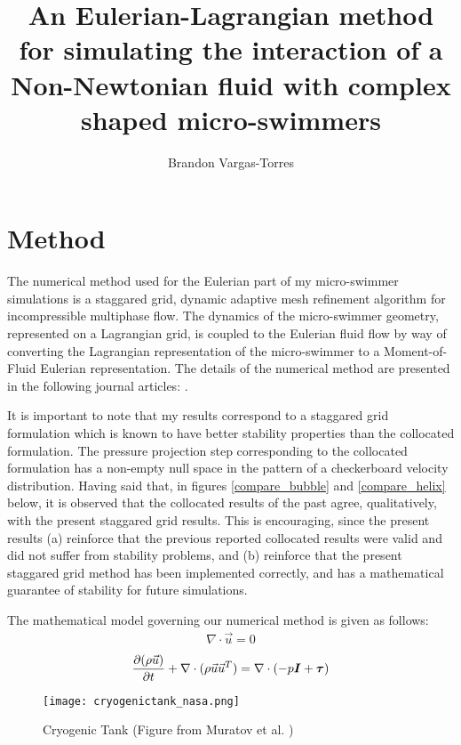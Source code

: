 \documentclass[]{article}
\title{An Eulerian-Lagrangian method for simulating the interaction of a 
 Non-Newtonian fluid with complex shaped micro-swimmers}
\author{Brandon Vargas-Torres}
\newcommand{\bmI}{\mbox{\boldmath $I$\unboldmath}}
\newcommand{\bmtau}{\mbox{\boldmath $\tau$\unboldmath}}
\begin{document}
\maketitle
\vspace*{-10mm}
\section*{Method} 
The numerical method used for the Eulerian part of
my micro-swimmer simulations is a staggared
grid, dynamic adaptive mesh refinement algorithm for 
incompressible multiphase flow.  
The dynamics of the micro-swimmer geometry, represented on a 
Lagrangian grid, is coupled to the Eulerian fluid flow by way of converting
the Lagrangian representation of the micro-swimmer to a
Moment-of-Fluid Eulerian representation.  The details of the numerical method
are presented in the following journal articles: 
\cite{dyadechko2005moment,ArientiSussman2014,peihierarchical,OHTA201966}.

It is important to note that my results correspond to a staggared grid 
formulation which is known to have better stability properties than the
collocated formulation\cite{rhie1983numerical}.  
The pressure projection step corresponding
to the collocated formulation has a non-empty null space in the pattern of
a checkerboard velocity distribution.
Having said that,
in figures \ref{compare_bubble} and
\ref{compare_helix} below, it is observed that the collocated results of the
past agree, qualitatively, with the present staggared grid results.  This
is encouraging, since the present results (a) reinforce that the previous 
reported collocated results were valid and did not suffer from stability 
problems, and (b) reinforce that the present staggared grid method has 
been implemented correctly, and has a mathematical guarantee of 
stability\cite{GUITTET2015215} for future simulations.

The mathematical model governing our numerical method is given as follows:
\begin{eqnarray}
	\nabla\cdot\vec{u}=0 \label{divfree}
\end{eqnarray}
\begin{eqnarray}
	\frac{\partial(\rho\vec{u})}{\partial t}+
	\nabla\cdot(\rho\vec{u}\vec{u}^{T})=
	\nabla\cdot(-p\bmI + \bmtau)
\end{eqnarray}




\begin{figure}[h]
\centering
\texttt{[image: cryogenictank\_nasa.png]}
\caption*{Cryogenic Tank (Figure from Muratov et al. \cite{Muratov2011})}
\end{figure}
\end{document}
